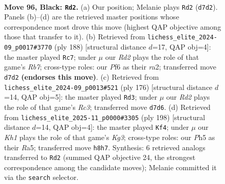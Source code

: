 \documentclass[11pt]{article}
\begin{document}
\clearpage

\begin{figure}[p]\centering
\begin{subfigure}{0.46\textwidth}\centering
\resizebox{\linewidth}{!}{%
\newchessgame
\chessboard[
  setfen={7k/3r2p1/5p2/7p/7P/6PK/1RN5/8 b - - 17 96},
  showmover=false,
  pgfstyle=straightmove, color=movearrow, markmove={d7-d2}
]}
\caption{}
\end{subfigure}\hfill
\begin{subfigure}{0.46\textwidth}\centering
\resizebox{\linewidth}{!}{%
\newchessgame
\chessboard[
  setfen={8/1R6/6pk/7p/7P/6PK/r7/8 w - - 26 95},
  showmover=false,
  pgfstyle=straightmove, color=movearrow, markmove={b7-c7}
]}
\caption{}
\end{subfigure}
\\[4pt]
\begin{subfigure}{0.46\textwidth}\centering
\resizebox{\linewidth}{!}{%
\newchessgame
\chessboard[
  setfen={8/r7/6pk/7p/7P/2R3P1/5PK1/8 w - - 57 89},
  showmover=false,
  pgfstyle=straightmove, color=movearrow, markmove={c3-d3}
]}
\caption{}
\end{subfigure}\hfill
\begin{subfigure}{0.46\textwidth}\centering
\resizebox{\linewidth}{!}{%
\newchessgame
\chessboard[
  setfen={8/6pk/1r5p/R6P/6P1/6K1/8/8 w - - 55 100},
  showmover=false,
  pgfstyle=straightmove, color=movearrow, markmove={g3-f4}
]}
\caption{}
\end{subfigure}
\caption{\textbf{Move 96, Black: \texttt{Rd2}.} (a) Our position; Melanie plays \texttt{Rd2} (\texttt{d7d2}). Panels (b)--(d) are the retrieved master positions whose correspondence most drove this move (highest QAP objective among those that transfer to it). (b) Retrieved from \texttt{lichess\_elite\_2024-09\_p0017\#3770} (ply 188) [structural distance $d$=17, QAP obj=4]: the master played \texttt{Rc7}; under $\mu$ our \emph{Rd2} plays the role of that game's \emph{Rb7}; cross-type roles: our \emph{P}f6 as their \emph{r}a2; transferred move \texttt{d7d2} \textbf{(endorses this move)}. (c) Retrieved from \texttt{lichess\_elite\_2024-09\_p0013\#521} (ply 176) [structural distance $d$=14, QAP obj=5]: the master played \texttt{Rd3}; under $\mu$ our \emph{Rd2} plays the role of that game's \emph{Rc3}; transferred move \texttt{d7d6}. (d) Retrieved from \texttt{lichess\_elite\_2025-11\_p0000\#3305} (ply 198) [structural distance $d$=14, QAP obj=4]: the master played \texttt{Kf4}; under $\mu$ our \emph{Kh1} plays the role of that game's \emph{Kg3}; cross-type roles: our \emph{P}h5 as their \emph{R}a5; transferred move \texttt{h8h7}. Synthesis: 6 retrieved analogs transferred to \texttt{Rd2} (summed QAP objective 24, the strongest correspondence among the candidate moves); Melanie committed it via the \texttt{search} selector.}
\label{fig:thought-m191}
\end{figure}
\end{document}

